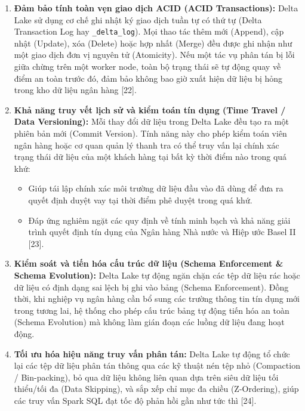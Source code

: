 \documentclass[
  13pt,
  a4paper,
]{report}
\providecommand{\tightlist}{%
  \setlength{\itemsep}{0pt}\setlength{\parskip}{0pt}}
\begin{document}
\begin{enumerate}
\def\labelenumi{\arabic{enumi}.}
\tightlist
\item
  \textbf{Đảm bảo tính toàn vẹn giao dịch ACID (ACID Transactions):}
  Delta Lake sử dụng cơ chế ghi nhật ký giao dịch tuần tự có thứ tự
  (Delta Transaction Log hay \texttt{\_delta\_log}). Mọi thao tác thêm
  mới (Append), cập nhật (Update), xóa (Delete) hoặc hợp nhất (Merge)
  đều được ghi nhận như một giao dịch đơn vị nguyên tử (Atomicity). Nếu
  một tác vụ phân tán bị lỗi giữa chừng trên một worker node, toàn bộ
  trạng thái sẽ tự động quay về điểm an toàn trước đó, đảm bảo không bao
  giờ xuất hiện dữ liệu bị hỏng trong kho dữ liệu ngân hàng {[}22{]}.
\item
  \textbf{Khả năng truy vết lịch sử và kiểm toán tín dụng (Time Travel /
  Data Versioning):} Mỗi thay đổi dữ liệu trong Delta Lake đều tạo ra
  một phiên bản mới (Commit Version). Tính năng này cho phép kiểm toán
  viên ngân hàng hoặc cơ quan quản lý thanh tra có thể truy vấn lại
  chính xác trạng thái dữ liệu của một khách hàng tại bất kỳ thời điểm
  nào trong quá khứ:

  \begin{itemize}
  \tightlist
  \item
    Giúp tái lập chính xác môi trường dữ liệu đầu vào đã dùng để đưa ra
    quyết định duyệt vay tại thời điểm phê duyệt trong quá khứ.
  \item
    Đáp ứng nghiêm ngặt các quy định về tính minh bạch và khả năng giải
    trình quyết định tín dụng của Ngân hàng Nhà nước và Hiệp ước Basel
    II {[}23{]}.
  \end{itemize}
\item
  \textbf{Kiểm soát và tiến hóa cấu trúc dữ liệu (Schema Enforcement \&
  Schema Evolution):} Delta Lake tự động ngăn chặn các tệp dữ liệu rác
  hoặc dữ liệu có định dạng sai lệch bị ghi vào bảng (Schema
  Enforcement). Đồng thời, khi nghiệp vụ ngân hàng cần bổ sung các
  trường thông tin tín dụng mới trong tương lai, hệ thống cho phép cấu
  trúc bảng tự động tiến hóa an toàn (Schema Evolution) mà không làm
  gián đoạn các luồng dữ liệu đang hoạt động.
\item
  \textbf{Tối ưu hóa hiệu năng truy vấn phân tán:} Delta Lake tự động tổ
  chức lại các tệp dữ liệu phân tán thông qua các kỹ thuật nén tệp nhỏ
  (Compaction / Bin-packing), bỏ qua dữ liệu không liên quan dựa trên
  siêu dữ liệu tối thiểu/tối đa (Data Skipping), và sắp xếp chỉ mục đa
  chiều (Z-Ordering), giúp các truy vấn Spark SQL đạt tốc độ phản hồi
  gần như tức thì {[}24{]}.
\end{enumerate}
\end{document}
